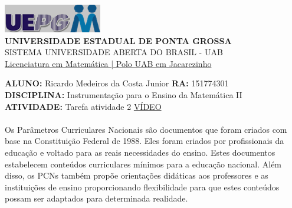 \documentclass[a4paper, 12pt]{article}
\begin{document}
\begin{flushleft}\includegraphics{logo}\\
\textbf{UNIVERSIDADE ESTADUAL DE PONTA GROSSA} \\
SISTEMA UNIVERSIDADE ABERTA DO BRASIL - UAB \\
\underline{Licenciatura em Matemática | Polo UAB em Jacarezinho}\end{flushleft} 
\textbf{ALUNO:} Ricardo Medeiros da Costa Junior   \textbf{RA:} 151774301 \\
\textbf{DISCIPLINA:} Instrumentação para o Ensino da Matemática II \\
\textbf{ATIVIDADE:} Tarefa atividade 2 \underline{VÍDEO}\\ \\
Os Parâmetros Curriculares Nacionais são documentos que foram criados com base na Constituição Federal de 1988. Eles foram criados por profissionais da educação e voltado para as reais necessidades do ensino. Estes documentos estabelecem conteúdos curriculares mínimos para a educação nacional. Além disso, os PCNs também propõe orientações didáticas aos professores e as instituições de ensino proporcionando flexibilidade para que estes conteúdos possam ser adaptados para determinada realidade.
\end{document}
